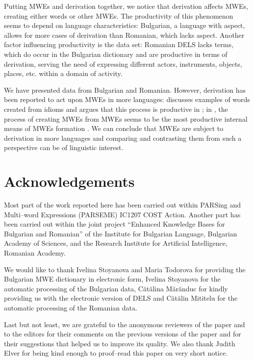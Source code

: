 \documentclass[output=paper]{langsci/langscibook}
\begin{document}
Putting MWEs and derivation together, we notice that derivation affects
MWEs, creating either words or other MWEs. The productivity of this
phenomenon seems to depend on language characteristics: Bulgarian, a
language with aspect, allows for more cases of derivation than
Romanian, which lacks aspect. Another factor influencing productivity
is the data set: Romanian DELS lacks terms, which do occur in the
Bulgarian dictionary and are productive in terms of derivation, serving
the need of expressing different actors, instruments, objects, places,
etc. within a domain of activity.



We have presented data from Bulgarian and Romanian. However,  derivation has been reported to act upon MWEs in more
languages: \cite{piela2007} discusses examples of words created from
idioms and argues that this process is productive in ; in
, the process of creating MWEs from  MWEs seems to be
the most productive internal means of MWEs formation \citep{ermakova2015}. We can conclude that MWEs are subject to derivation in more
languages and comparing and contrasting them from such a perspective
can be of linguistic \nolinebreak interest.





\section[Acknowledgements]{Acknowledgements}

Most part of the work reported here has been carried out within PARSing
and Multi–word Expressions (PARSEME) IC1207 COST Action. Another part
has been carried out within the joint project “Enhanced Knowledge Bases
for Bulgarian and Romanian” of the Institute for Bulgarian Language,
Bulgarian Academy of Sciences, and the Research Institute for
Artificial Intelligence, Romanian \linebreak Academy.



We would like to thank Ivelina Stoyanova and Maria Todorova for
providing the Bulgarian MWE dictionary in electronic form, Ivelina
Stoyanova for the automatic processing of the Bulgarian data, Cătălina
Mărănduc for kindly providing us with the electronic version of DELS
and Cătălin Mititelu for the automatic processing of the Romanian data.



Last but not least, we are grateful to the anonymous reviewers of the
paper and to the editors for their comments on the previous versions of
the paper and for their suggestions that helped us to improve its
quality. We also thank Judith Elver for being kind enough to proof–read
this paper on very short notice.
\end{document}
